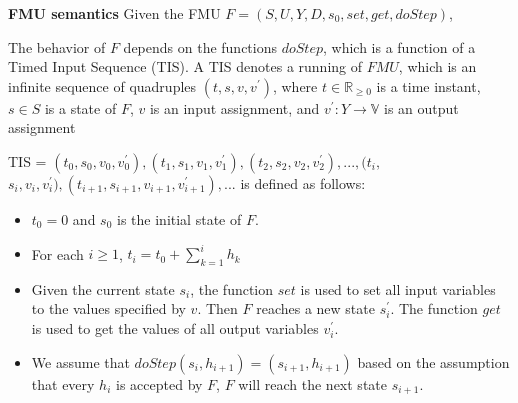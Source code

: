 \begin{definition}
\textbf{FMU semantics}
Given the FMU $F=(S,U,Y,D,s_{0},set,get,doStep)$,
\end{definition} 
The behavior of $F$ depends on the functions $doStep$, which is a function of a Timed Input Sequence (TIS).
A TIS denotes a running of $FMU$, which is an infinite sequence of quadruples $(t,s,v,v^{\prime})$, where $t \in \mathbb{R}_{\geqslant{0}}$ is a time instant, $s \in S$ is a state of $F$, $v$ is an input assignment, and $v^{\prime} : Y \rightarrow \mathbb{V}$ is an output assignment
 
TIS = $(t_{0},s_{0},v_{0},v_{0}^{\prime}), (t_{1},s_{1},v_{1},v_{1}^{\prime}),(t_{2},s_{2},v_{2},v_{2}^{\prime}), ..., (t_{i},$
$s_{i},v_{i},v_{i}^{\prime}), (t_{i+1},s_{i+1},v_{i+1},v_{i+1}^{\prime}), ...$ is
defined as follows:
\begin{itemize}
\item
$t_{0} = 0$ and $s_{0}$ is the initial state of $F$.
\item
For each $i \geqslant 1$, $t_{i} = t_{0} + \sum_{k = 1}^i h_{k}$
\item
Given the current state $s_{i}$, the function $set$ is used to set all input variables to the values specified by $v$. Then $F$ reaches a new state $s_{i}^{\prime}$. The function $get$ is used to get the values of all output variables $v_{i}^{\prime}$.
\item 
We assume that $doStep(s_{i}, h_{i+1}) = (s_{i+1},h_{i+1})$ based on the assumption that every $h_{i}$ is accepted by $F$, $F$ will reach the next state $s_{i+1}$.
\end{itemize}


